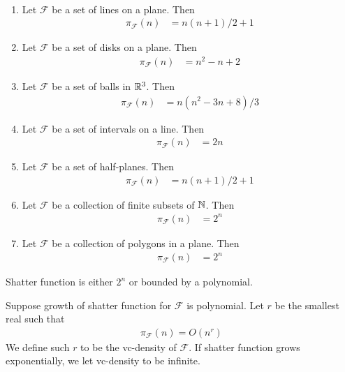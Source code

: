 \documentclass{amsart}
\newcommand{\F}{\mathcal F}
\begin{document}
\begin{Example} \ \\
	\begin{enumerate}
		\item Let $\F$ be a set of lines on a plane. Then
		\begin{align*}
			\pi_\F(n) &= n(n+1)/2 + 1
		\end{align*}
		\item Let $\F$ be a set of disks on a plane. Then
		\begin{align*}
			\pi_\F(n) &= n^2 - n + 2
		\end{align*}
		\item Let $\F$ be a set of balls in $\mathbb{R}^3$. Then
		\begin{align*}
			\pi_\F(n) &= n(n^2 - 3n + 8)/3
		\end{align*}
		\item Let $\F$ be a set of intervals on a line. Then
		\begin{align*}
			\pi_\F(n) &= 2n
		\end{align*}
		\item Let $\F$ be a set of half-planes. Then
		\begin{align*}
			\pi_\F(n) &= n(n+1)/2 + 1
		\end{align*}
		\item Let $\F$ be a collection of finite subsets of $\mathbb{N}$. Then
		\begin{align*}
			\pi_\F(n) &= 2^n
		\end{align*}
		\item Let $\F$ be a collection of polygons in a plane. Then
		\begin{align*}
			\pi_\F(n) &= 2^n
		\end{align*}
	\end{enumerate}
\end{Example}

\begin{Theorem} 
	Shatter function is either $2^n$ or bounded by a polynomial.
\end{Theorem}

\begin{Definition}
	Suppose growth of shatter function for $\F$ is polynomial.
	Let $r$ be the smallest real such that 
	\begin{align*}
		\pi_\F(n) = O(n^r)
	\end{align*}
	We define such $r$ to be the vc-density of $\F$.
	If shatter function grows exponentially, we let vc-density to be infinite.
\end{Definition}
\end{document}
